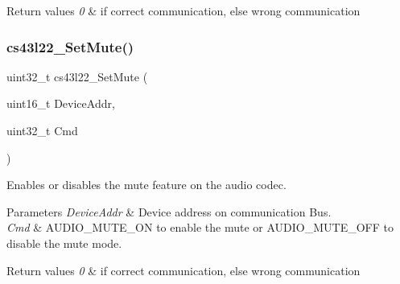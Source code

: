 \begin{DoxyRetVals}{Return values}
{\em 0} & if correct communication, else wrong communication \\
\hline
\end{DoxyRetVals}
\mbox{\label{group___c_s43_l22___exported___functions_gaed17c2b64d79830afa43b5a45b159286}} 
\subsubsection{\texorpdfstring{cs43l22\+\_\+\+Set\+Mute()}{cs43l22\_SetMute()}}
{\footnotesize\ttfamily uint32\+\_\+t cs43l22\+\_\+\+Set\+Mute (\begin{DoxyParamCaption}\item[{uint16\+\_\+t}]{Device\+Addr,  }\item[{uint32\+\_\+t}]{Cmd }\end{DoxyParamCaption})}



Enables or disables the mute feature on the audio codec. 


\begin{DoxyParams}{Parameters}
{\em Device\+Addr} & Device address on communication Bus. ~\newline
\\
\hline
{\em Cmd} & A\+U\+D\+I\+O\+\_\+\+M\+U\+T\+E\+\_\+\+ON to enable the mute or A\+U\+D\+I\+O\+\_\+\+M\+U\+T\+E\+\_\+\+O\+FF to disable the mute mode. \\
\hline
\end{DoxyParams}

\begin{DoxyRetVals}{Return values}
{\em 0} & if correct communication, else wrong communication \\
\hline
\end{DoxyRetVals}
\mbox{\label{group___c_s43_l22___exported___functions_gaad55b2ed28b599b34f4bfe50df745f0d}} 
